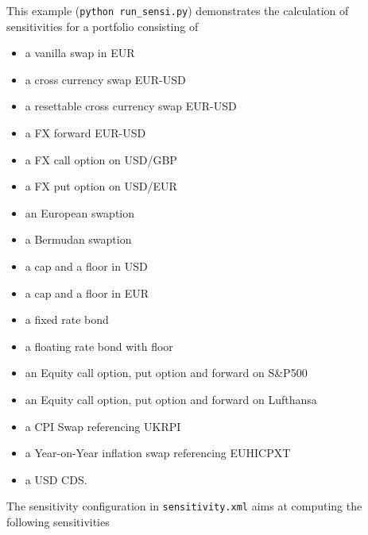 This example ({\tt python run\_sensi.py}) demonstrates the calculation of sensitivities for a portfolio consisting of
\begin{itemize}
\item a vanilla swap in EUR
\item a cross currency swap EUR-USD
\item a resettable cross currency swap EUR-USD
\item a FX forward EUR-USD
\item a FX call option on USD/GBP %
\item a FX put option on USD/EUR
\item an European swaption
\item a Bermudan swaption 
\item a cap and a floor in USD
\item a cap and a floor in EUR
\item a fixed rate bond
\item a floating rate bond with floor
\item an Equity call option, put option and forward on S\&P500
\item an Equity call option, put option and forward on Lufthansa
\item a CPI Swap referencing UKRPI
\item a Year-on-Year inflation swap referencing EUHICPXT
\item a USD CDS.
\end{itemize}

The sensitivity configuration in {\tt sensitivity.xml} aims at computing the following sensitivities

